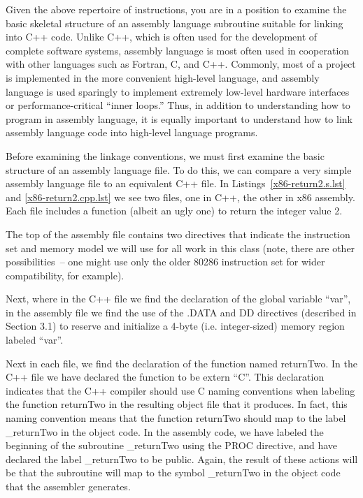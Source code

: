 Given the above repertoire of instructions, you are in a position to
examine the basic skeletal structure of an assembly language
subroutine suitable for linking into C++ code. Unlike C++, which is
often used for the development of complete software systems, assembly
language is most often used in cooperation with other languages such
as Fortran, C, and C++. Commonly, most of a project is implemented in
the more convenient high-level language, and assembly language is used
sparingly to implement extremely low-level hardware interfaces or
performance-critical ``inner loops.'' Thus, in addition to
understanding how to program in assembly language, it is equally
important to understand how to link assembly language code into
high-level language programs.

Before examining the linkage conventions, we must first examine the
basic structure of an assembly language file. To do this, we can
compare a very simple assembly language file to an equivalent C++
file. In Listings~\ref{x86-return2.s.lst} and \ref{x86-return2.cpp.lst} we see
two files, one in C++, the other in x86 assembly. Each file includes a
function (albeit an ugly one) to return the integer value 2.

The top of the assembly file contains two directives that indicate the
instruction set and memory model we will use for all work in this
class (note, there are other possibilities~-- one might use only the
older 80286 instruction set for wider compatibility, for example).

\begin{figure}

\vspace{-0.25in}\end{figure}

Next, where in the C++ file we find the declaration of the global
variable ``var'', in the assembly file we find the use of the .DATA
and DD directives (described in Section 3.1) to reserve and initialize
a 4-byte (i.e. integer-sized) memory region labeled ``var''.

Next in each file, we find the declaration of the function named
returnTwo. In the C++ file we have declared the function to be extern
``C''. This declaration indicates that the C++ compiler should use C
naming conventions when labeling the function returnTwo in the
resulting object file that it produces. In fact, this naming
convention means that the function returnTwo should map to the label
\_returnTwo in the object code. In the assembly code, we have labeled
the beginning of the subroutine \_returnTwo using the PROC directive,
and have declared the label \_returnTwo to be public. Again, the
result of these actions will be that the subroutine will map to the
symbol \_returnTwo in the object code that the assembler generates.

